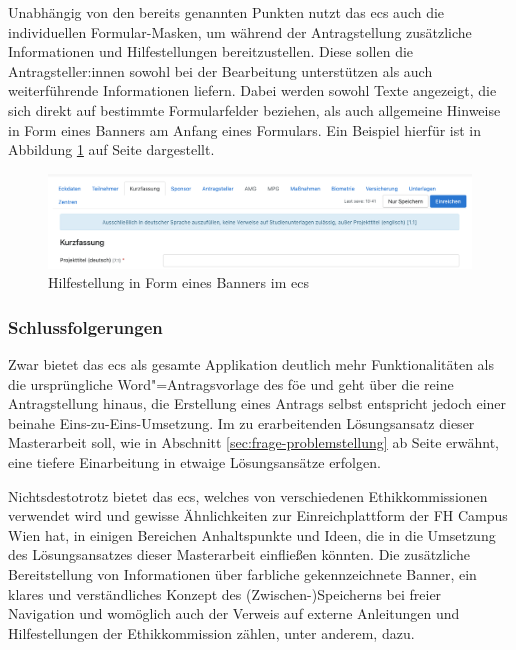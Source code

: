 \documentclass[a4paper,12pt,twoside,numbers=noendperiod]{scrreprt}
\begin{document}
\medskip

Unabhängig von den bereits genannten Punkten nutzt das \ac{ecs} auch die individuellen Formular-Masken, um während der Antragstellung zusätzliche Informationen und Hilfestellungen bereitzustellen. Diese sollen die Antragsteller:innen sowohl bei der Bearbeitung unterstützen als auch weiterführende Informationen liefern. Dabei werden sowohl Texte angezeigt, die sich direkt auf bestimmte Formularfelder beziehen, als auch allgemeine Hinweise in Form eines Banners am Anfang eines Formulars. Ein Beispiel hierfür ist in Abbildung \ref{fig:ecs-banner-hilfestellung} auf Seite \pageref{fig:ecs-banner-hilfestellung} dargestellt.

\begin{figure}[ht]
    \centering
    \includegraphics[width=\linewidth]{thesis/images/Luidold_ECS-Banner-Hilfestellung.png}
    \caption[Hilfestellung in Form eines Banners im \acl{ecs}]{Hilfestellung in Form eines Banners im \acl{ecs} \cite{ethikkommission_der_medizinischen_universitat_innsbruck_ethikkommission_2023}}
    \label{fig:ecs-banner-hilfestellung}
\end{figure}

\subsubsection*{Schlussfolgerungen}
\label{sub-sub-sec:schlussfolgerungen-ecs}

Zwar bietet das \acl{ecs} als gesamte Applikation deutlich mehr Funktionalitäten als die ursprüngliche Word"=Antragsvorlage des \ac{föe} und geht über die reine Antragstellung hinaus, die Erstellung eines Antrags selbst entspricht jedoch einer beinahe Eins-zu-Eins-Umsetzung. Im zu erarbeitenden Lösungsansatz dieser Masterarbeit soll, wie in Abschnitt \ref{sec:frage-problemstellung} ab Seite \pageref{sec:frage-problemstellung} erwähnt, eine tiefere Einarbeitung in etwaige Lösungsansätze erfolgen.

Nichtsdestotrotz bietet das \ac{ecs}, welches von verschiedenen Ethikkommissionen verwendet wird und gewisse Ähnlichkeiten zur Einreichplattform der FH Campus Wien hat, in einigen Bereichen Anhaltspunkte und Ideen, die in die Umsetzung des Lösungsansatzes dieser Masterarbeit einfließen könnten. Die zusätzliche Bereitstellung von Informationen über farbliche gekennzeichnete Banner, ein klares und verständliches Konzept des (Zwischen-)Speicherns bei freier Navigation und womöglich auch der Verweis auf externe Anleitungen und Hilfestellungen der Ethikkommission zählen, unter anderem, dazu.
\end{document}

